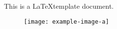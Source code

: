 This is a \LaTeX template document.\cite{small}

\begin{figure}
    \centering
    \texttt{[image: example-image-a]}
\end{figure}

